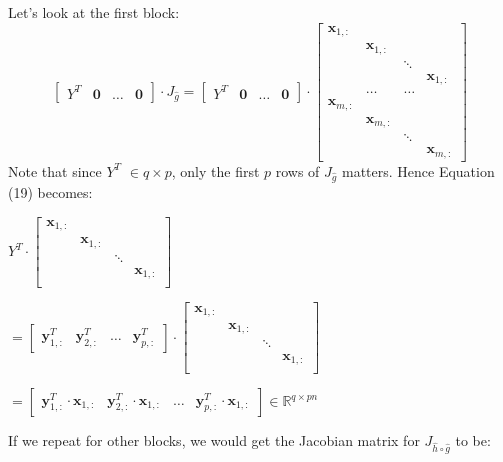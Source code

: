 \documentclass{article}
\begin{document}
Let's look at the first block:
\begin{equation}
\begin{bmatrix}Y^T & \textbf{0}& \hdots& \textbf{0}\end{bmatrix} \cdot J_{\widehat{g}} = 
    \begin{bmatrix}
    Y^T & \textbf{0}& \hdots& \textbf{0}
\end{bmatrix} \cdot 
\begin{bmatrix}
     \mathbf{x}_{1,:}  & &   &  \\
      & \mathbf{x}_{1,:} & &  \\
     &  & \ddots &\\
     &  &  & \mathbf{x}_{1,:}\\
     & \hdots& \hdots &\\
     \mathbf{x}_{m,:}  & &   &  \\
      & \mathbf{x}_{m,:} & &  \\
     &  & \ddots &\\
     &  &  & \mathbf{x}_{m,:}
\end{bmatrix}
\end{equation}
Note that since $Y^T$  $\in q\times p$, only the first $p$ rows of $J_{\widehat{g}}$ matters. Hence Equation (19) becomes: 
\begin{center}
    $Y^T \cdot
    \begin{bmatrix}
     \mathbf{x}_{1,:}  & &   &  \\
      & \mathbf{x}_{1,:} & &  \\
     &  & \ddots &\\
     &  &  & \mathbf{x}_{1,:}\\
\end{bmatrix}$
\end{center}

\begin{center}
    $=\begin{bmatrix}
    \mathbf{y}_{1,:}^T & \mathbf{y}_{2,:}^T & \hdots & \mathbf{y}_{p,:}^T
\end{bmatrix} \cdot
    \begin{bmatrix}
     \mathbf{x}_{1,:}  & &   &  \\
      & \mathbf{x}_{1,:} & &  \\
     &  & \ddots &\\
     &  &  & \mathbf{x}_{1,:}\\
\end{bmatrix}$
\end{center}
\begin{center}
    $= \begin{bmatrix}
     \mathbf{y}_{1,:}^T\cdot\mathbf{x}_{1,:}  &  \mathbf{y}_{2,:}^T\cdot\mathbf{x}_{1,:} & \hdots & \mathbf{y}_{p,:}^T\cdot\mathbf{x}_{1,:}\end{bmatrix} \in \mathbb{R}^{q\times pn}$
\end{center}
If we repeat for other blocks, we would get the Jacobian matrix for $J_{\widehat{h}\circ\widehat{g}} $ to be:
\end{document}

